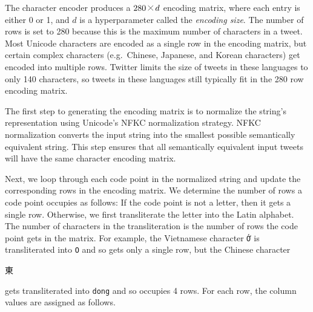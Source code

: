 \documentclass[sigconf,anonymous,review]{acmart}
\renewcommand{\times}{\mathbin{\tikz [x=1.4ex,y=1.4ex,line width=.1ex] \draw (0,0) -- (1,1) (0,1) -- (1,0);}}%
\newcommand{\str}[1]{\texttt{#1}}
\newcommand{\defn}[1]{\textit{#1}}
\begin{document}
\begin{description}
The character encoder produces a $280\times d$ encoding matrix,
where each entry is either 0 or 1,
and $d$ is a hyperparameter called the \defn{encoding size}.
The number of rows is set to 280 because this is the maximum number of characters in a tweet.
Most Unicode characters are encoded as a single row in the encoding matrix,
but certain complex characters (e.g.\ Chinese, Japanese, and Korean characters) get encoded into multiple rows.
Twitter limits the size of tweets in these languages to only 140 characters,
so tweets in these languages still typically fit in the 280 row encoding matrix.

The first step to generating the encoding matrix is to normalize the string's representation using Unicode's NFKC normalization strategy.
NFKC normalization converts the input string into the smallest possible semantically equivalent string.
This step ensures that all semantically equivalent input tweets will have the same character encoding matrix.

Next, we loop through each code point in the normalized string and update the corresponding rows in the encoding matrix.
We determine the number of rows a code point occupies as follows:
If the code point is not a letter, then it gets a single row.
Otherwise, we first transliterate the letter into the Latin alphabet.
The number of characters in the transliteration is the number of rows the code point gets in the matrix.
For example, the Vietnamese character \str{\foreignlanguage{vietnamese}{Ớ}} is transliterated into \str{O} and so gets only a single row,
but the Chinese character \begin{CJK}{UTF8}{min}東\end{CJK} gets transliterated into \str{dong} and so occupies 4 rows.
For each row, the column values are assigned as follows.


\end{description}
\end{document}
